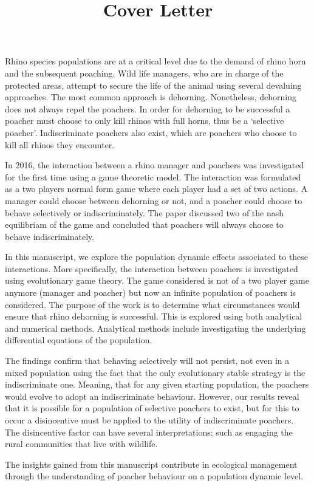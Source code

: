 \documentclass[10pt]{article}
\title{Cover Letter}
\date{}
\begin{document}
\maketitle

Rhino species populations are at a critical level due to the demand of rhino horn
and the subsequent poaching. Wild life managers, who are in charge of the protected
areas, attempt to secure the life of the animal using several devaluing approaches.
The most common approach is dehorning. Nonetheless, dehorning does not always repel
the poachers. In order for dehorning to be successful a poacher must choose to only
kill rhinos with full horns, thus be a `selective poacher'. Indiscriminate poachers
also exist, which are poachers who choose to kill all rhinos they encounter.

In 2016, the interaction between a rhino manager and poachers was investigated for
the first time using a game theoretic model. The interaction was formulated as a
two players normal form game where each player had a set of two actions. A manager
could choose between dehorning or not, and a poacher could choose to behave selectively
or indiscriminately. The paper discussed two of the nash equilibriam of the game
and concluded that poachers will always choose to behave indiscriminately.


In this manuscript, we explore the population dynamic effects associated to these
interactions. More specifically, the interaction between poachers is investigated
using evolutionary game theory. The game considered is not of a two player game
anymore (manager and poacher) but now an infinite population of poachers is considered. 
The purpose of the work is to determine what circumstances would ensure that rhino
dehorning is successful. This is explored using both analytical and numerical methods.
Analytical methods include investigating the underlying differential
equations of the population.

The findings confirm that behaving selectively will not persist, not even in a
mixed population using the fact that the only evolutionary stable strategy is the
indiscriminate one. Meaning, that for any given starting population, the poachers
would evolve to adopt an indiscriminate behaviour. However, our results reveal
that it is possible for a population of selective poachers to exist, but for this
to occur a disincentive must be applied to the utility of indiscriminate poachers.
The disincentive factor can have several interpretations; such as engaging the
rural communities that live with wildlife.

The insights gained from this manuscript contribute in ecological management through
the understanding of poacher behaviour on a population dynamic level.
\end{document}
